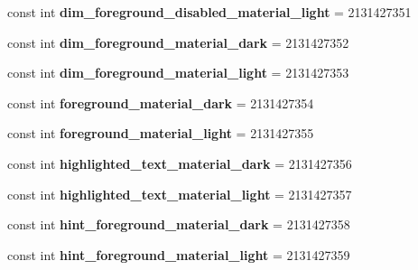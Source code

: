\begin{DoxyCompactItemize}
\item 
\mbox{\label{classXaria_1_1Resource_1_1Color_abeed673ec01dd6566b326630446bcb2b}} 
const int {\bfseries dim\+\_\+foreground\+\_\+disabled\+\_\+material\+\_\+light} = 2131427351
\item 
\mbox{\label{classXaria_1_1Resource_1_1Color_a05e8ea2b8f05d8acbeb570b8df0b1ae2}} 
const int {\bfseries dim\+\_\+foreground\+\_\+material\+\_\+dark} = 2131427352
\item 
\mbox{\label{classXaria_1_1Resource_1_1Color_a7811368e929e2c9593b90b996750b385}} 
const int {\bfseries dim\+\_\+foreground\+\_\+material\+\_\+light} = 2131427353
\item 
\mbox{\label{classXaria_1_1Resource_1_1Color_a2f0c166d95ec7dfae11572f2b758a010}} 
const int {\bfseries foreground\+\_\+material\+\_\+dark} = 2131427354
\item 
\mbox{\label{classXaria_1_1Resource_1_1Color_ab5bba0ca9a1a3aab83b32738685b014c}} 
const int {\bfseries foreground\+\_\+material\+\_\+light} = 2131427355
\item 
\mbox{\label{classXaria_1_1Resource_1_1Color_a4e6d4bb5b71657aaa65d89acba9cb4f9}} 
const int {\bfseries highlighted\+\_\+text\+\_\+material\+\_\+dark} = 2131427356
\item 
\mbox{\label{classXaria_1_1Resource_1_1Color_acc8a1237975124b4754fa742c52239aa}} 
const int {\bfseries highlighted\+\_\+text\+\_\+material\+\_\+light} = 2131427357
\item 
\mbox{\label{classXaria_1_1Resource_1_1Color_a521ad97636509ef08fd0f5bb67601207}} 
const int {\bfseries hint\+\_\+foreground\+\_\+material\+\_\+dark} = 2131427358
\item 
\mbox{\label{classXaria_1_1Resource_1_1Color_a8549a45cd1fe6810a88881bde3ffa34d}} 
const int {\bfseries hint\+\_\+foreground\+\_\+material\+\_\+light} = 2131427359
\item 

\end{DoxyCompactItemize}
